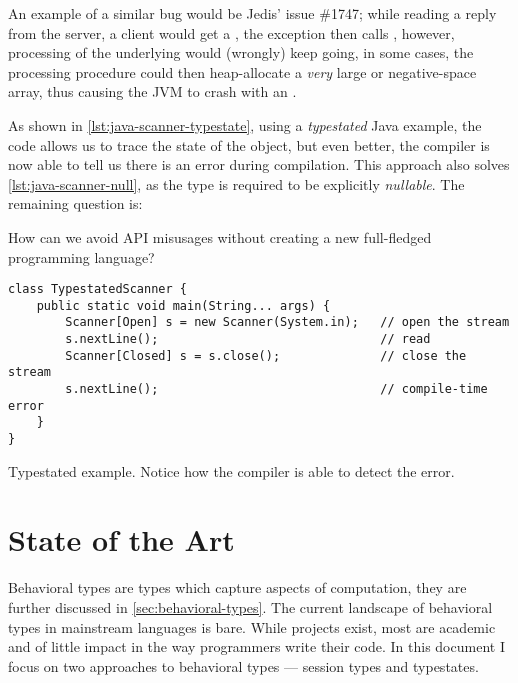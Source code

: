An example of a similar bug would be Jedis' issue \#1747;
while reading a reply from the server, a client would get a ,
the exception then calls , however, processing of the underlying would (wrongly) keep going,
in some cases, the processing procedure could then heap-allocate a \emph{very} large or negative-space array,
thus causing the \gls{JVM} to crash with an .


As shown in \autoref{lst:java-scanner-typestate}, using a \emph{typestated} Java example,
the code allows us to trace the state of the object, but even better,
the compiler is now able to tell us there is an error during compilation.
This approach also solves \autoref{lst:java-scanner-null}, as the type is required to be explicitly \emph{nullable}.
The remaining question is:
\begin{displayquote}
    How can we avoid \gls{API} misusages without creating a new full-fledged programming language?
\end{displayquote}

\begin{listing}
    \begin{verbatim}
class TypestatedScanner {
    public static void main(String... args) {
        Scanner[Open] s = new Scanner(System.in);   // open the stream
        s.nextLine();                               // read
        Scanner[Closed] s = s.close();              // close the stream
        s.nextLine();                               // compile-time error
    }
}
    \end{verbatim}
    \caption{
        Typestated  example.
        Notice how the compiler is able to detect the error.
    }
    \label{lst:java-scanner-typestate}
\end{listing}

\section{State of the Art}\label{sec:state-of-the-art}

Behavioral types are types which capture aspects of computation, they are further discussed in \autoref{sec:behavioral-types}.
The current landscape of behavioral types in mainstream languages is bare.
While projects exist, most are academic and of little impact in the way programmers write their code.
In this document I focus on two approaches to behavioral types --- session types and typestates.

